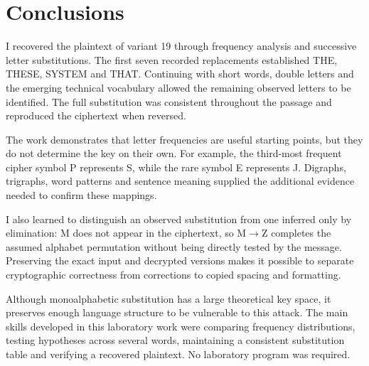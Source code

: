\chapter{Conclusions}
I recovered the plaintext of variant 19 through frequency analysis and
successive letter substitutions. The first seven recorded replacements
established THE, THESE, SYSTEM and THAT. Continuing with short words,
double letters and the emerging technical vocabulary allowed the remaining
observed letters to be identified. The full substitution was consistent
throughout the passage and reproduced the ciphertext when reversed.

The work demonstrates that letter frequencies are useful starting points,
but they do not determine the key on their own. For example, the third-most
frequent cipher symbol P represents S, while the rare symbol E represents
J. Digraphs, trigraphs, word patterns and sentence meaning supplied the
additional evidence needed to confirm these mappings.

I also learned to distinguish an observed substitution from one inferred
only by elimination: M does not appear in the ciphertext, so M$\to$Z
completes the assumed alphabet permutation without being directly tested
by the message. Preserving the exact input and decrypted versions makes
it possible to separate cryptographic correctness from corrections to
copied spacing and formatting.

Although monoalphabetic substitution has a large theoretical key space,
it preserves enough language structure to be vulnerable to this attack.
The main skills developed in this laboratory work were comparing
frequency distributions, testing hypotheses across several words,
maintaining a consistent substitution table and verifying a recovered
plaintext. No laboratory program was required.
